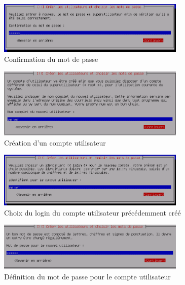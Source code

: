 \documentclass[11pt,a4paper,titlepage, oneside]{article}
\begin{document}
		\begin{figure}[htp]
                        \centering
                        \includegraphics[width=0.8\textwidth,natwidth=610,natheight=642]{images/debian7.png}
                        \caption{Confirmation du mot de passe}
		\end{figure}
	 
		\begin{figure}[htp]
                        \centering
                        \includegraphics[width=0.8\textwidth,natwidth=610,natheight=642]{images/debian8.png}
                        \caption{Création d'un compte utilisateur}
		\end{figure}
	 
		\begin{figure}[htp]
                        \centering
                        \includegraphics[width=0.8\textwidth,natwidth=610,natheight=642]{images/debian9.png}
                        \caption{Choix du login du compte utilisateur précédemment créé}
		\end{figure}

		\begin{figure}[htp]
                        \centering
                        \includegraphics[width=0.8\textwidth,natwidth=610,natheight=642]{images/debian10.png}
                        \caption{Définition du mot de passe pour le compte utilisateur}
		\end{figure}
	
\end{document}
